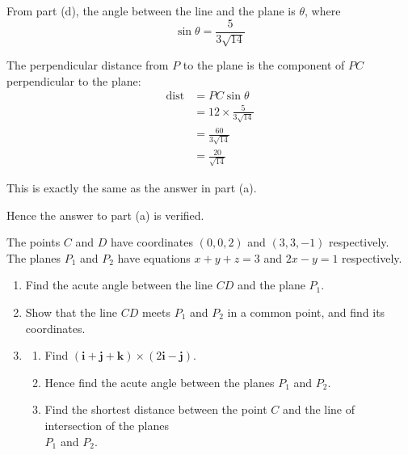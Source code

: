 \documentclass[leqno]{article}
\begin{document}
\begin{enumerate}[
  label=\textbf{\arabic*.},
  leftmargin=*,
  topsep=0pt,
  partopsep=0pt,
  parsep=0pt
]
\begin{djsSolution}
\begin{enumerate}[label=\textbf{(\alph*)}]
From part (d), the angle between the line and the plane is $\theta$, where
\[
\sin\theta=\frac{5}{3\sqrt{14}}
\]

The perpendicular distance from $P$ to the plane is the component of $PC$ perpendicular to the plane:
\begin{align*}
\mathrm{dist}
&=PC\sin\theta\\
&=12\times\frac{5}{3\sqrt{14}}\\
&=\frac{60}{3\sqrt{14}}\\
&=\frac{20}{\sqrt{14}}
\end{align*}

This is exactly the same as the answer in part (a).

Hence the answer to part (a) is verified. 
\end{enumerate}
\end{djsSolution}


\newpage

\questionitem

The points $C$ and $D$ have coordinates $(0,0,2)$ and $(3,3,-1)$ respectively.\\

The planes $P_1$ and $P_2$ have equations $x+y+z=3$ and $2x-y=1$ respectively. \\
\begin{enumerate}[label=\textbf{(\alph*)}]
  \item Find the acute angle between the line $CD$ and the plane $P_1$.  \\
  \item Show that the line $CD$ meets $P_1$ and $P_2$ in a common point, and find its coordinates.  \\
  \item
  \begin{enumerate}[label=(\roman*)]
    \item Find $(\mathbf{i}+\mathbf{j}+\mathbf{k})\times(2\mathbf{i}-\mathbf{j})$. 
    \item Hence find the acute angle between the planes $P_1$ and $P_2$. 
    \item Find the shortest distance between the point $C$ and the line of intersection of the planes\\ $P_1$ and $P_2$.  \\
  \end{enumerate}
\end{enumerate}


\end{enumerate}
\end{document}
